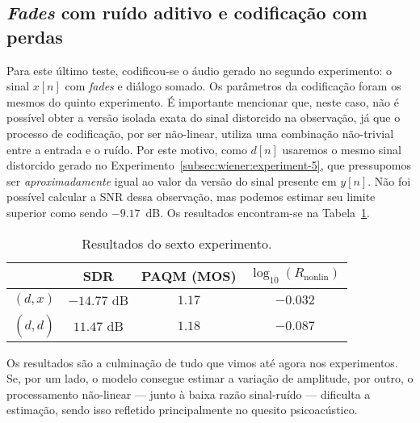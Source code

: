 \subsection{\textit{Fades} com ruído aditivo e codificação com perdas} \label{subsec:wiener:experiment-6}

Para este último teste, codificou-se o áudio gerado no segundo experimento: o sinal
$x[n]$ com \textit{fades} e diálogo somado. Os parâmetros da codificação foram os
mesmos do quinto experimento. É importante mencionar que, neste caso, não é possível
obter a versão isolada exata do sinal distorcido na observação, já que o processo de
codificação, por ser não-linear, utiliza uma combinação não-trivial entre a entrada e o
ruído. Por este motivo, como $d[n]$ usaremos o mesmo sinal distorcido gerado no
Experimento~\ref{subsec:wiener:experiment-5}, que pressupomos ser
\emph{aproximadamente} igual ao valor da versão do sinal presente em $y[n]$. Não foi
possível calcular a SNR dessa observação, mas podemos estimar seu limite superior como
sendo $-9.17$~dB. Os resultados encontram-se na Tabela~\ref{tab:wf:experiment-6}.
{\def\arraystretch{1.25}\tabcolsep=10pt
\begin{table}[!ht]
	\centering
	\caption[Resultados do sexto experimento: \textit{fades} com ruído aditivo e codificação com perdas]{Resultados do sexto experimento.}
	\label{tab:wf:experiment-6}
	\begin{tabular}{cccc}
		\toprule
		               & SDR         & PAQM (MOS) & $\log_{10}(R_{\text{nonlin}})$ \\
		\midrule
		$(d, x)$       & $-14.77$ dB & $1.17$     & $-0.032$                       \\
		$(d, \hat{d})$ & $11.47$ dB  & $1.18$     & $-0.087$                       \\ \bottomrule
	\end{tabular}
\end{table}
}

Os resultados são a culminação de tudo que vimos até agora nos experimentos. Se, por um
lado, o modelo consegue estimar a variação de amplitude, por outro, o processamento
não-linear --- junto à baixa razão sinal-ruído --- dificulta a estimação, sendo isso
refletido principalmente no quesito psicoacústico.
